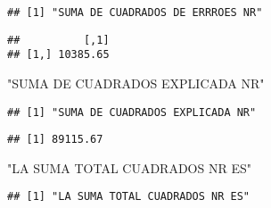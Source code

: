 \documentclass[
]{article}
\newenvironment{Shaded}{\begin{snugshade}}{\end{snugshade}}
\newcommand{\DataTypeTok}[1]{\textcolor[rgb]{0.13,0.29,0.53}{#1}}
\newcommand{\DecValTok}[1]{\textcolor[rgb]{0.00,0.00,0.81}{#1}}
\newcommand{\KeywordTok}[1]{\textcolor[rgb]{0.13,0.29,0.53}{\textbf{#1}}}
\newcommand{\NormalTok}[1]{#1}
\newcommand{\OperatorTok}[1]{\textcolor[rgb]{0.81,0.36,0.00}{\textbf{#1}}}
\newcommand{\StringTok}[1]{\textcolor[rgb]{0.31,0.60,0.02}{#1}}
\begin{document}
\begin{verbatim}
## [1] "SUMA DE CUADRADOS DE ERRROES NR"
\end{verbatim}

\begin{Shaded}
\end{Shaded}

\begin{verbatim}
##          [,1]
## [1,] 10385.65
\end{verbatim}

\begin{Shaded}
\begin{Highlighting}[]
\StringTok{"SUMA DE CUADRADOS EXPLICADA NR"}
\end{Highlighting}
\end{Shaded}

\begin{verbatim}
## [1] "SUMA DE CUADRADOS EXPLICADA NR"
\end{verbatim}

\begin{Shaded}
\end{Shaded}

\begin{verbatim}
## [1] 89115.67
\end{verbatim}

\begin{Shaded}
\begin{Highlighting}[]
\StringTok{"LA SUMA TOTAL CUADRADOS NR ES"}
\end{Highlighting}
\end{Shaded}

\begin{verbatim}
## [1] "LA SUMA TOTAL CUADRADOS NR ES"
\end{verbatim}

\begin{Shaded}
\end{Shaded}
\end{document}
